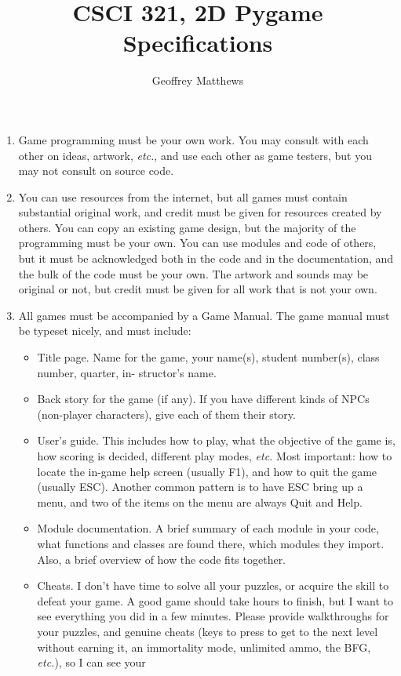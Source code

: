 \documentclass{article}
\title{CSCI 321, 2D Pygame Specifications}
\author{Geoffrey Matthews}
\begin{document}
\maketitle
\begin{enumerate}
\item Game programming must be your own work. You may consult with
  each other on ideas, artwork, {\em etc.}, and use each other as game
  testers, but you may not consult on source code.
\item You can use resources from the internet, but all games must
  contain substantial original work, and credit must be given for
  resources created by others. You can copy an existing game
  design, but the majority of the programming must be your own. You
  can use modules and code of others, but it must be acknowledged both
  in the code and in the documentation, and the bulk of the code must
  be your own. The artwork and sounds may be original or not, but
  credit must be given for all work that is not your own.
\item All games must be accompanied by a Game Manual. The game manual
  must be typeset nicely, and 
  must include:
\begin{itemize}
\item Title page. Name for the game, your name(s), student number(s),
  class number, quarter, in- structor’s name.
\item Back story for the game (if any). If you have different kinds of
  NPCs (non-player characters), give each of them their story.
\item User's guide. This includes how to play, what the objective of
  the game is, how scoring is decided, different play modes,
  {\em etc.} Most important: how to locate the in-game help screen
  (usually F1), and how to quit the game (usually ESC). Another
  common pattern is to have ESC bring up a menu, and two of the items
  on the menu are always Quit and Help.
\item Module documentation. A brief summary of each module in your
  code, what functions and classes are found there, which modules they
  import. Also, a brief overview of how the code fits together.
\item Cheats. I don’t have time to solve all your puzzles, or acquire
  the skill to defeat your game. A good game should take hours to
  finish, but I want to see everything you did in a few minutes.
  Please provide walkthroughs for your puzzles, and genuine cheats
  (keys to press to get to the next level without earning it, an
  immortality mode, unlimited ammo, the BFG, {\em etc.}), so I can see your

\end{itemize}
\end{enumerate}
\end{document}
